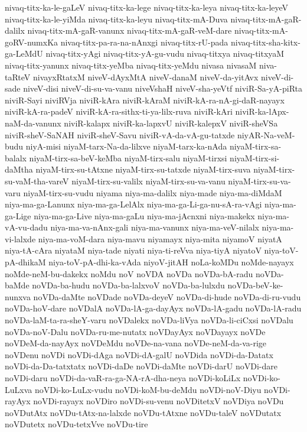 {nivaq-titx-ka-le-gaLeV
nivaq-titx-ka-lege
nivaq-titx-ka-leya
nivaq-titx-ka-leyeV
nivaq-titx-ka-le-yiMda
nivaq-titx-ka-leyu
nivaq-titx-mA-Duva
nivaq-titx-mA-gaR-dalilx
nivaq-titx-mA-gaR-vanunx
nivaq-titx-mA-gaR-veM-dare
nivaq-titx-mA-goRV-numxKa
nivaq-titx-pa-ra-na-nAnxgi
nivaq-titx-rU-pada
nivaq-titx-sha-kitx-ga-LeMdU
nivaq-titx-yAgi
nivaq-titx-yA-gu-vudu
nivaq-titxya
nivaq-titxyaM
nivaq-titx-yanunx
nivaq-titx-yeMba
nivaq-titx-yeMdu
nivasa
nivasaM
niva-taRteV
nivayxRtatxM
niveV-dAyxMtA
niveV-danaM
niveV-da-yitAvx
niveV-di-sade
niveV-disi
niveV-di-su-va-vanu
niveVshaH
niveV-sha-yeVtf
niviR-Sa-yA-piRta
niviR-Sayi
niviRVja
niviR-kAra
niviR-kAraM
niviR-kA-ra-nA-gi-daR-nayayx
niviR-kA-ra-padeV
niviR-kA-ra-sithx-ti-ya-lilx-ruva
niviR-kAri
niviR-ka-lApx-naM-da-vanunx
niviR-kalapx
niviR-ka-lapxvU
niviR-kalepxV
niviR-sheVSa
niviR-sheV-SaNAH
niviR-sheV-Savu
niviR-vA-da-vA-gu-tatxde
niyAR-Na-veM-budu
niyA-misi
niyaM-tarx-Na-da-lilxve
niyaM-tarx-ka-nAda
niyaM-tirx-sa-balalx
niyaM-tirx-sa-beV-keMba
niyaM-tirx-salu
niyaM-tirxsi
niyaM-tirx-si-daMtha
niyaM-tirx-su-tAtxne
niyaM-tirx-su-tatxde
niyaM-tirx-suva
niyaM-tirx-su-vaM-tha-vareV
niyaM-tirx-su-valilx
niyaM-tirx-su-va-vanu
niyaM-tirx-su-va-varu
niyaM-tirx-su-vudu
niyama
niya-ma-dalilx
niya-made
niya-ma-diMdaM
niya-ma-ga-Lanunx
niya-ma-ga-LelAlx
niya-ma-ga-Li-ga-nu-sA-ra-vAgi
niya-ma-ga-Lige
niya-ma-ga-Live
niya-ma-gaLu
niya-ma-jAcnxni
niya-makekx
niya-ma-vA-vu-dadu
niya-ma-va-nAnx-gali
niya-ma-vanunx
niya-ma-veV-nilalx
niya-ma-vi-lalxde
niya-ma-voM-dara
niya-mavu
niyamayx
niya-mita
niyamoV
niyatA
niya-tA-cAra
niyataM
niya-tade
niyati
niya-ti-reVva
niya-tiyA
niyatoV
niya-toV-pA-dhikaM
niya-toV-pA-dhi-ka-vAda
niyoV-jitAH
noLa-koMDu
noMde-nayayx
noMde-neM-bu-dakekx
noMdu
noV
noVDA
noVDa
noVDa-bA-radu
noVDa-baMde
noVDa-ba-hudu
noVDa-ba-lalxvoV
noVDa-ba-lulxdu
noVDa-beV-ke-nunxva
noVDa-daMte
noVDade
noVDa-deyeV
noVDa-di-hude
noVDa-di-ru-vudu
noVDa-hoV-dare
noVDalA
noVDa-lA-ga-dayAyx
noVDa-lA-gadu
noVDa-lA-radu
noVDa-laM-ta-ra-sheY-varu
noVDalekx
noVDa-liVya
noVDa-li-ciCxsi
noVDalu
noVDa-noV-Dalu
noVDa-ru-me-nutatx
noVDayAyx
noVDayayx
noVDe
noVDeM-da-nayAyx
noVDeMdu
noVDe-na-vana
noVDe-neM-da-va-rige
noVDenu
noVDi
noVDi-dAga
noVDi-dA-galU
noVDida
noVDi-da-Datatx
noVDi-da-Da-tatxtatx
noVDi-daDe
noVDi-daMte
noVDi-darU
noVDi-dare
noVDi-daru
noVDi-da-vaR-ra-ga-NA-rA-dha-neya
noVDi-koLiLx
noVDi-ko-LuLxva
noVDi-ko-LuLx-vudu
noVDi-koM-bu-deMdu
noVDi-noV-Diyu
noVDi-rayAyx
noVDi-rayayx
noVDiro
noVDi-su-venu
noVDitetxV
noVDiya
noVDu
noVDutAtx
noVDu-tAtx-na-lalxde
noVDu-tAtxne
noVDu-taleV
noVDutatx
noVDutetx
noVDu-tetxVve
noVDu-tire
}
